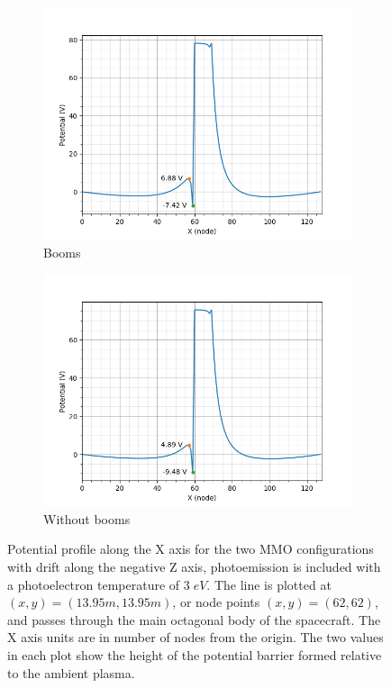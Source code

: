 \begin{figure}[H]
  \begin{subfigure}[b]{0.5\textwidth}
  \includegraphics[width=\textwidth]{figures/MMO/PHTemp/WB/L_PHTemp_WB.png}
  \caption{Booms}
  \label{fig:L_PHTemp_WB}
\end{subfigure}
\begin{subfigure}[b]{0.5\textwidth}
  \includegraphics[width=\textwidth]{figures/MMO/PHTemp/NB/L_PHTemp_NB.png}
  \caption{Without booms}
  \label{fig:L_PHTemp_NB}
\end{subfigure}
\caption{Potential profile along the X axis for the two MMO configurations with drift along the negative Z axis, photoemission is included with a photoelectron temperature of $3 \; eV$. The line is plotted at $(x,y) = (13.95 m, 13.95 m)$, or node points $(x,y) = (62,62)$, and passes through the main octagonal body of the spacecraft. The X axis units are in number of nodes from the origin. The two values in each plot show the height of the potential barrier formed relative to the ambient plasma.}
\label{fig:Line_PHTemp}
\end{figure}

